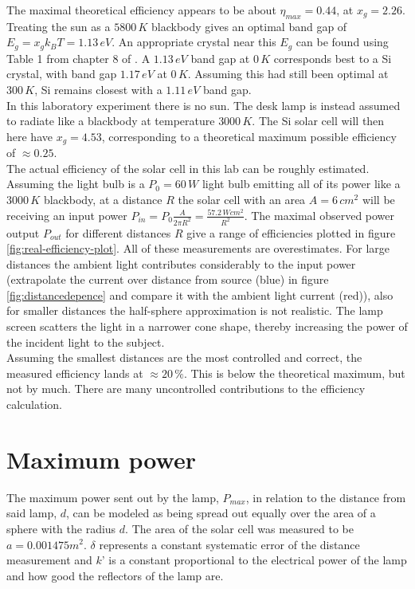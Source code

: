 \documentclass[a4paper,twoside=false,abstract=false,numbers=noenddot,
titlepage=false,headings=small,parskip=half,version=last]{scrartcl}
\begin{document}
The maximal theoretical efficiency appears to be about $\eta_{max}=0.44$, at $x_g=2.26$.
Treating the sun as a $5800\,K$ blackbody gives an optimal band gap of $E_g =
x_g k_B T = 1.13\,eV$.
An appropriate crystal near this $E_g$ can be found using Table 1 from chapter 8 of \cite{Kittel}.
A $1.13\,eV$ band gap at $0\,K$ corresponds best to a Si crystal, with band gap
$1.17\,eV$ at $0\,K$.
Assuming this had still been optimal at $300\,K$, Si remains closest with a
$1.11\,eV$ band gap.\\
In this laboratory experiment there is no sun. The desk lamp is instead assumed to radiate like a blackbody at temperature $3000\,K$. The Si solar cell will then here have $x_g = 4.53$, corresponding to a theoretical maximum possible efficiency of $\approx 0.25$.\\
The actual efficiency of the solar cell in this lab can be roughly estimated.
Assuming the light bulb is a $P_0=60\,W$ light bulb emitting all of its power
like a $3000\,K$ blackbody, at a distance $R$ the solar cell with an area
$A=6\,cm^2$ will be receiving an input power $P_{in} = P_0 \frac{A}{2\pi R^2}
= \frac{57.2\,Wcm^2}{R^2}$.
The maximal observed power output $P_{out}$ for different distances $R$ give a range of efficiencies plotted in figure \ref{fig:real-efficiency-plot}.
All of these measurements are overestimates.
For large distances the ambient light contributes considerably to the input
power (extrapolate the current over distance from source (blue) in
figure \ref{fig:distancedepence} and compare it with the ambient light current (red)),
also for smaller distances the half-sphere approximation is not realistic.
The lamp screen scatters the light in a narrower cone shape, thereby increasing
the power of the incident light to the subject.\\
Assuming the smallest distances are the most controlled and correct, the measured efficiency lands at $\approx 20\,\%$.
This is below the theoretical maximum, but not by much. There are many uncontrolled contributions to the efficiency calculation.

\section{Maximum power}
The maximum power sent out by the lamp, $P_{max}$, in relation to the distance from said lamp, $d$, can be modeled as being spread out equally over the area of a sphere with the radius $d$.
The area of the solar cell was measured to be $a=0.001475 m^{2}$.
$\delta$ represents a constant systematic error of the distance measurement and $k’$ is a constant proportional to the electrical power of the lamp and how good the reflectors of the lamp are.
\end{document}
